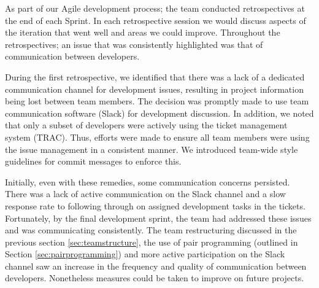\documentclass{l3proj}
\begin{document}




As part of our Agile development process; the team conducted retrospectives at the end of each Sprint. In each retrospective session we would discuss aspects of the iteration that went well and areas we could improve. Throughout the retrospectives; an issue that was consistently highlighted was that of communication between developers.

During the first retrospective, we identified that there was a lack of a dedicated communication channel for development issues, resulting in project information being lost between team members. The decision was promptly made to use team communication software (Slack) for development discussion. In addition, we noted that only a subset of developers were actively using the ticket management system (TRAC). Thus, efforts were made to ensure all team members were using the issue management in a consistent manner. We introduced team-wide style guidelines for commit messages to enforce this. 

Initially, even with these remedies, some communication concerns persisted. There was a lack of active communication on the Slack channel and a slow response rate to following through on assigned development tasks in the tickets. Fortunately, by the final development sprint, the team had addressed these issues and was communicating consistently. The team restructuring discussed in the previous section \ref{sec:teamstructure}, the use of pair programming (outlined in Section \ref{sec:pairprogramming}) and more active participation on the Slack channel saw an increase in the frequency and quality of communication between developers. Nonetheless measures could be taken to improve on future projects.
\end{document}
